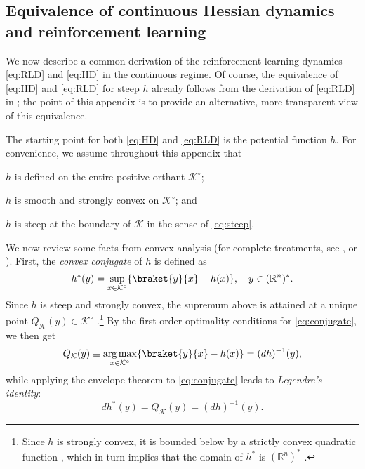 \documentclass[reqno]{amsart}
\theoremstyle{plain}
\theoremstyle{definition}
\theoremstyle{remark}
\numberwithin{equation}{section}
\numberwithin{theorem}{section}
\begin{document}
\subsection{Equivalence of continuous Hessian dynamics and reinforcement learning}
\label{sec:HDandRL}

We now describe a common derivation of the reinforcement learning dynamics \eqref{eq:RLD} and \eqref{eq:HD} in the continuous regime.
Of course, the equivalence of \eqref{eq:HD} and \eqref{eq:RLD} for steep $h$  already follows from the derivation of \eqref{eq:RLD} in \cite{MS16};
the point of this appendix is to provide an alternative, more transparent view of this equivalence.

The starting point for both \eqref{eq:HD} and \eqref{eq:RLD} is the potential function $h$.
For convenience, we assume throughout this appendix that
\begin{inparaenum}
\item
$h$ is defined on the entire positive orthant ${{\mathcal{K}}^{\circ}}$;
\item
$h$ is smooth and strongly convex on ${{\mathcal{K}}^{\circ}}$;
and
\item
$h$ is steep at the boundary of ${\mathcal{K}}$ in the sense of \eqref{eq:steep}.
\end{inparaenum}

We now review some facts from convex analysis (for complete treatments, see \citealp{Roc70}, or \citealp{HUL01}).
First, the \emph{convex conjugate} of $h$ is defined as
\begin{equation}
\label{eq:conjugate}
h^\ast(y)
	= \sup_{x \in{{\mathcal{K}}^{\circ}}} \{\braket{y}{x} - h(x)\},
	\quad
	y\in{({\mathbb{R}}^{n})^{\ast}}.
\end{equation}
Since $h$ is steep and strongly convex, the supremum above is attained at a unique point ${Q_{\mathcal{K}}}(y) \in {{\mathcal{K}}^{\circ}}$ \cite[Theorem 26.5]{Roc70}.\footnote{Since $h$ is strongly convex, it is bounded below by a strictly convex quadratic function \citep[Theorem B.4.1.1]{HUL01}, which in turn implies that the domain of $h^\ast$ is ${({\mathbb{R}}^{n})^{\ast}}$ \cite[Corollary 13.1]{Roc70}.}
By the first-order optimality conditions for \eqref{eq:conjugate}, we then get
\begin{equation}
\label{eq:choice-app}
{Q_{\mathcal{K}}}(y)
	\equiv \operatorname*{arg\,max}_{x\in{{\mathcal{K}}^{\circ}}} \{\braket{y}{x} - h(x)\}
	= (dh)^{-1}(y),
\end{equation}
while applying the envelope theorem to \eqref{eq:conjugate} leads to \emph{Legendre's identity}:
\begin{equation}
\label{eq:Legendre}
dh^{\ast}(y)
	= {Q_{\mathcal{K}}}(y)
	= (dh)^{-1}(y).
\end{equation}
\end{document}
